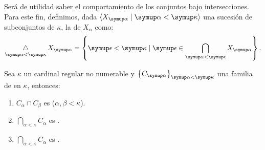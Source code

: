 Será de utilidad saber el comportamiento de los conjuntos \cna{} bajo intersecciones.
Para este fin, definimos, dada $\op{X_\alpha\mid \alpha<\kappa}$ una sucesión
de subconjuntos de $\kappa$, la  de
$X_\alpha$ como:
\[
    \dint_{\alpha<\kappa}X_\alpha
    =
    \set{\epsilon<\kappa\mid\epsilon\in \bigcap_{\alpha<\epsilon}X_\alpha} .
\]

\begin{teo}\label{teo:intersection-cna}
    Sea $\kappa$ un cardinal regular no numerable y $\set{C_\alpha}_{\alpha<\kappa}$ una familia
    de \cna{} en $\kappa$, entonces:
    \begin{enumerate}[label=\alph*)]
        \item $C_\alpha\cap C_\beta$ es \cna{} ($\alpha,\beta < \kappa$).
        \item $\bigcap_{\alpha<\kappa}C_\alpha$ es \cna.
        \item $\dint_{\alpha<\kappa}C_\alpha$ es \cna.
    \end{enumerate}
\end{teo}

